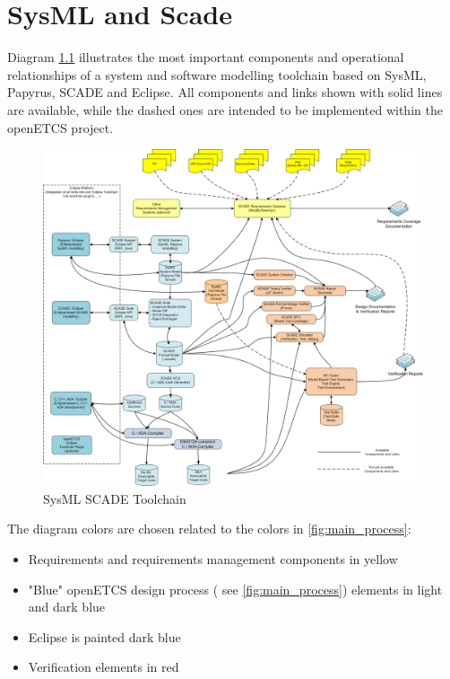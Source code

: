 \chapter{SysML and Scade}
\label{sec:sysML-Scade}

Diagram \ref{fig:SysML_SCADE_Toolchain} illustrates the most important components and operational relationships of a system and software modelling toolchain based on SysML, Papyrus, SCADE and Eclipse. 
All components and links shown with solid lines are available, while the dashed ones are intended to be implemented within the openETCS project. 


\begin{figure}[htbp]
	\centering
		\includegraphics[width=1.10\textwidth]{images/SysML_SCADE_Toolchain.png}
	\caption{SysML SCADE Toolchain}
	\label{fig:SysML_SCADE_Toolchain}
\end{figure}


The diagram colors are chosen related to the colors in \ref{fig:main_process}: 

\begin{itemize}
	\item Requirements and requirements management components in yellow
	\item "Blue" openETCS design process ( see \ref{fig:main_process}) elements in light and dark blue
	\item Eclipse is painted dark blue
	\item Verification elements in red
\end{itemize}

